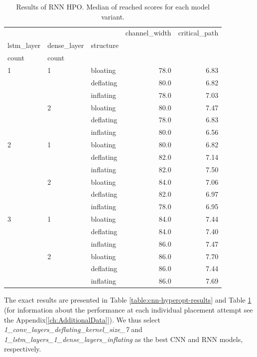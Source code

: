 \begin{table}
	\begin{tabular}{lllrr}
		\toprule
		&   &           &  channel\_width &  critical\_path \\
		lstm\_layer & dense\_layer & structure &                &                   \\
		count & count &  &                &                   \\
		\midrule
		1 & 1 & bloating &           78.0 &              6.83 \\
		&   & deflating &           80.0 &              6.82 \\
		&   & inflating &           78.0 &              7.03 \\
		& 2 & bloating &           80.0 &              7.47 \\
		&   & deflating &           78.0 &              6.83 \\
		&   & inflating &           80.0 &              6.56 \\
		2 & 1 & bloating &           80.0 &              6.82 \\
		&   & deflating &           82.0 &              7.14 \\
		&   & inflating &           82.0 &              7.50 \\
		& 2 & bloating &           84.0 &              7.06 \\
		&   & deflating &           82.0 &              6.97 \\
		&   & inflating &           78.0 &              6.95 \\
		3 & 1 & bloating &           84.0 &              7.44 \\
		&   & deflating &           84.0 &              7.40 \\
		&   & inflating &           86.0 &              7.47 \\
		& 2 & bloating &           86.0 &              7.70 \\
		&   & deflating &           86.0 &              7.44 \\
		&   & inflating &           86.0 &              7.69 \\
		\bottomrule
	\end{tabular}
	\caption{Results of \gls{RNN} HPO. Median of reached scores for each model variant.}
	\label{table:rnn-hyperopt-results}
\end{table}

The exact results are presented in Table \ref{table:cnn-hyperopt-results} and Table \ref{table:rnn-hyperopt-results} (for information about the performance at each individual placement attempt see the Appendix[\ref{ch:AdditionalData}]). We thus select \textit{1\_conv\_layers\_deflating\_kernel\_size\_7} and \textit{1\_lstm\_layers\_1\_dense\_layers\_inflating} as the best \gls{CNN} and \gls{RNN} models, respectively. 

